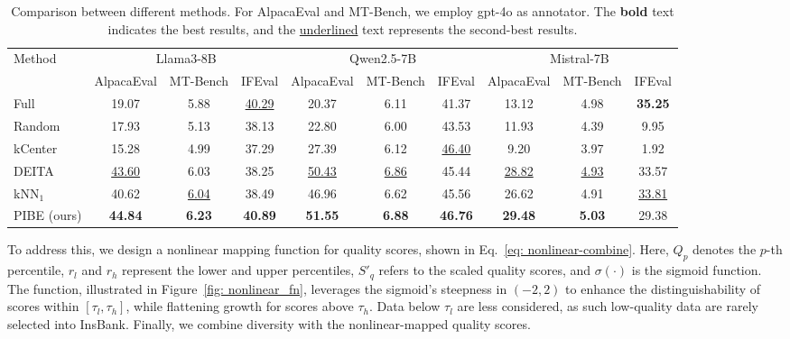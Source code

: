 \begin{table*}[htbp]
    \centering
    \small 
    \setlength{\tabcolsep}{5pt} 
    \begin{tabular}{l|ccc|ccc|ccc}
    \toprule
    \multirow{2}{*}{Method} & \multicolumn{3}{c|}{Llama3-8B} & \multicolumn{3}{c|}{Qwen2.5-7B} & \multicolumn{3}{c}{Mistral-7B} \\
    \cmidrule(lr){2-4} \cmidrule(lr){5-7} \cmidrule(lr){8-10}
           & AlpacaEval & MT-Bench & IFEval & AlpacaEval & MT-Bench & IFEval & AlpacaEval & MT-Bench & IFEval \\
    \midrule
    Full   & 19.07      & 5.88     & \underline{40.29} & 20.37   & 6.11    & 41.37    & 13.12   & 4.98   &   \textbf{35.25}  \\
    Random & 17.93      & 5.13     & 38.13             & 22.80   & 6.00    & 43.53    & 11.93    & 4.39   & 9.95     \\
    kCenter & 15.28     & 4.99     & 37.29             & 27.39   & 6.12    & \underline{46.40}    & 9.20  & 3.97    & 1.92     \\
    DEITA  & \underline{43.60} & 6.03 & 38.25         & \underline{50.43} & \underline{6.86} & 45.44 & \underline{28.82} & \underline{4.93} & 33.57 \\
    kNN$_1$ & 40.62     & \underline{6.04} & 38.49     & 46.96   & 6.62    & 45.56    & 26.62    & 4.91    & \underline{33.81} \\
    PIBE (ours)   & \textbf{44.84} & \textbf{6.23} & \textbf{40.89} & \textbf{51.55} & \textbf{6.88} & \textbf{46.76} & \textbf{29.48} & \textbf{5.03} & 29.38 \\
    \bottomrule
    \end{tabular}
    \caption{Comparison between different methods. For AlpacaEval and MT-Bench, we employ gpt-4o as annotator. The \textbf{bold} text indicates the best results, and the \underline{underlined} text represents the second-best results.}
    \label{tab: result-main}
\end{table*}


To address this, we design a nonlinear mapping function for quality scores, shown in Eq.~\ref{eq: nonlinear-combine}. Here, \(Q_p\) denotes the \(p\)-th percentile, \(r_l\) and \(r_h\) represent the lower and upper percentiles, \(S'_q\) refers to the scaled quality scores, and \(\sigma(\cdot)\) is the sigmoid function. The function, illustrated in Figure~\ref{fig: nonlinear_fn}, leverages the sigmoid's steepness in \((-2, 2)\) to enhance the distinguishability of scores within \([\tau_l, \tau_h]\), while flattening growth for scores above \(\tau_h\). Data below \(\tau_l\) are less considered, as such low-quality data are rarely selected into InsBank. Finally, we combine diversity with the nonlinear-mapped quality scores.


